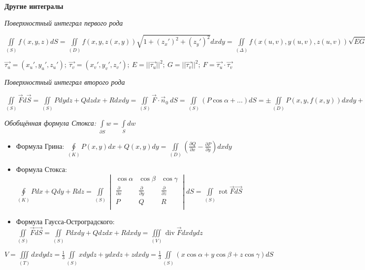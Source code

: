 \begin{center}
    \textbf{Другие интегралы}
\end{center}

\textit{Поверхностный интеграл первого рода}

$\displaystyle \iint\limits_{(S)}f(x, y, z)dS = \iint\limits_{(D)}f(x, y, z(x, y))\sqrt{1+(z_x')^2+(z_y')^2}dxdy = \iint\limits_{(\Delta)}f(x(u, v), y(u, v), z(u, v))\sqrt{EG - F^2}dudv$

$\displaystyle \vec{\tau_u} = (x_u',y_u',z_u'); ~\vec{\tau_v} = (x_v',y_v',z_v'); ~E = ||\vec{\tau_u}||^2; ~G = ||\vec{\tau_v}||^2; ~F = \vec{\tau_u} \cdot \vec{\tau_v}$

\vspace{1ex}
\textit{Поверхностный интеграл второго рода}

$\displaystyle \iint\limits_{(S)}\vec{F}d\vec{S} = \iint\limits_{(S)}Pdydz + Qdzdx + Rdxdy = \iint\limits_{(S)}\vec{F}\cdot\vec{n}_0~dS = \iint\limits_{(S)}(P\cos\alpha+\ldots)dS = \pm\iint\limits_{(D)}P(x,y,f(x,y))dxdy+\ldots$

\vspace{1ex}
\textit{Обобщённая формула Стокса:} 
$\displaystyle\int\limits_{\partial{S}}w = \int\limits_{S}dw$
\vspace{-2.5ex}
\begin{itemize}
    \setlength\itemsep{-0.5em}
    \item Формула Грина: $\displaystyle\oint\limits_{(K)}P(x, y)dx + Q(x, y)dy = \iint\limits_{(D)}\left(\frac{\partial Q}{\partial x} - \frac{\partial P}{\partial y}\right)dxdy$
    \item Формула Стокса: $\displaystyle \oint\limits_{(K)} Pdx + Qdy + Rdz = \iint\limits_{(S)}\begin{vmatrix}
    \cos{\alpha} & \cos{\beta} & \cos{\gamma} \\
    \frac{\partial}{\partial{x}} & \frac{\partial}{\partial{y}} & \frac{\partial}{\partial{z}} \\
    P & Q & R \\
    \end{vmatrix}dS =  \iint\limits_{(S)} \operatorname{rot}\vec{F} \vec{dS}$ 
    \item Формула Гаусса-Остроградского: $\displaystyle  \iint\limits_{(S)} \vec{F}\vec{dS} = \iint\limits_{(S)}Pdxdy + Qdzdx + Rdxdy = \iiint\limits_{(V)} \operatorname{div}\vec{F}dxdydz$ 
\end{itemize}

$\displaystyle V = \iiint\limits_{(T)}dxdydz = \frac{1}{3}\iint\limits_{(S)}xdydz+ydxdz+zdxdy = \frac{1}{3}\iint\limits_{(S)}(x\cos{\alpha} + y\cos{\beta} + z\cos{\gamma})dS$























